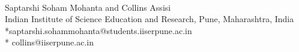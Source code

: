 \documentclass[10pt,letterpaper]{article}
\begin{document}
\vspace*{0.2in}

\begin{flushleft}
{\Large
\textbf{} %
}\\
Saptarshi Soham Mohanta and Collins Assisi
\bigskip
\\
Indian Institute of Science Education and Research, Pune, Maharashtra, India\\
\bigskip
*saptarshi.sohammohanta@students.iiserpune.ac.in \\
* collins@iiserpune.ac.in

\end{flushleft}
\end{document}
